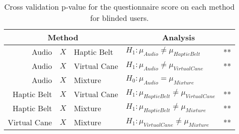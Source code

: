 
\begin{table}[!htb]
\centering
\caption{Cross validation p-value for the questionnaire score on each method for blinded users.}
\label{tab:lsd_questionnaire_blind}
\begin{tabular}{rcllr}
\toprule
      \multicolumn{3}{c}{Method} &                          \multicolumn{2}{c}{Analysis} \\
\midrule
       Audio & $X$ & Haptic Belt &        $H_1 : \mu_{Audio} \ne \mu_{Haptic Belt}$ & ** \\
      Audio & $X$ & Virtual Cane &       $H_1 : \mu_{Audio} \ne \mu_{Virtual Cane}$ & ** \\
           Audio & $X$ & Mixture &                $H_0 : \mu_{Audio} = \mu_{Mixture}$ &  \\
Haptic Belt & $X$ & Virtual Cane & $H_1 : \mu_{Haptic Belt} \ne \mu_{Virtual Cane}$ & ** \\
     Haptic Belt & $X$ & Mixture &      $H_1 : \mu_{Haptic Belt} \ne \mu_{Mixture}$ & ** \\
    Virtual Cane & $X$ & Mixture &     $H_1 : \mu_{Virtual Cane} \ne \mu_{Mixture}$ & ** \\
\bottomrule
\end{tabular}
\end{table}

